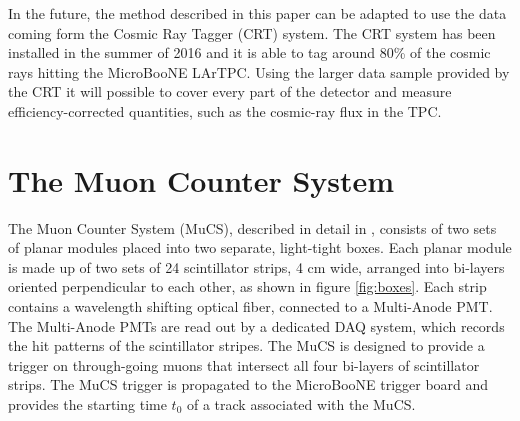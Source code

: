 \documentclass[a4paper,11pt]{article}
\begin{document}
In the future, the method described in this paper can be adapted to use the data coming form the Cosmic Ray Tagger (CRT) system\cite{crt}. The CRT system has been installed in the summer of 2016 and it is able to tag around 80\% of the cosmic rays hitting the MicroBooNE LArTPC. Using the larger data sample provided by the CRT it will possible to cover every part of the detector and measure efficiency-corrected quantities, such as the cosmic-ray flux in the TPC.


\section{The Muon Counter System}\label{sec:proc}
The Muon Counter System (MuCS), described in detail in \cite{mucs}, consists of two sets of planar modules placed into two separate, light-tight boxes. Each planar module is made up of two sets of 24 scintillator strips, 4 cm wide, arranged into bi-layers oriented perpendicular to each other, as shown in figure \ref{fig:boxes}. Each strip contains a wavelength shifting optical fiber, connected to a Multi-Anode PMT. The Multi-Anode PMTs are read out by a dedicated DAQ system, which records the hit patterns of the scintillator stripes.
The MuCS is designed to provide a trigger on through-going muons that intersect all four bi-layers of scintillator strips. The MuCS trigger is propagated to the MicroBooNE trigger board and provides the starting time $t_0$ of a track associated with the MuCS.
\end{document}
